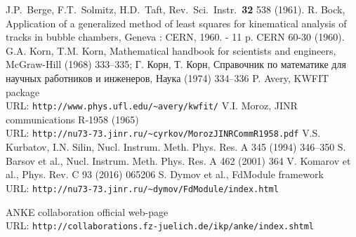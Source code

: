 \documentclass{webofc}
\begin{document}
\begin{thebibliography}{00}
 J.P.~Berge, F.T.~Solmitz, H.D.~Taft, Rev.\ Sci.\ Instr.\ \textbf{32} 538 (1961).
 R. Bock, Application of a generalized method of least squares for kinematical analysis of tracks in bubble chambers,       Geneva : CERN, 1960. - 11 p. CERN 60-30 (1960).
 G.A. Korn, T.M. Korn, Mathematical handbook for scientists and engineers, McGraw-Hill (1968) 333--335; \foreignlanguage{russian}{Г. Корн, Т. Корн, Справочник по математике для научных работников и инженеров, Наука (1974) 334--336}
 P. Avery, KWFIT package\\ URL: \texttt{http://www.phys.ufl.edu/\textasciitilde{}avery/kwfit/}
 V.I. Moroz, JINR communications R-1958 (1965)\\ URL: \texttt{http://nu73-73.jinr.ru/\textasciitilde{}cyrkov/MorozJINRCommR1958.pdf}
 V.S. Kurbatov, I.N. Silin, Nucl. Instrum. Meth. Phys. Res. A 345 (1994) 346--350
 S. Barsov et al., Nucl. Instrum. Meth. Phys. Res. A 462 (2001) 364
 V. Komarov et al., Phys. Rev. C 93 (2016) 065206
 S. Dymov et al., FdModule framework\\ URL: \texttt{http://nu73-73.jinr.ru/\textasciitilde{}dymov/FdModule/index.html}

 ANKE collaboration official web-page\\ URL: \texttt{http://collaborations.fz-juelich.de/ikp/anke/index.shtml} 


\end{thebibliography}
\end{document}
